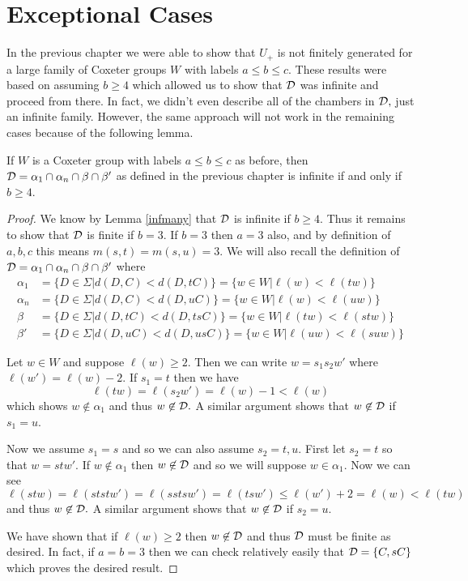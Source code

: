 \documentclass[class=book, crop=false]{standalone}
\begin{document}
\chapter{Exceptional Cases}
In the previous chapter we were able to show that $U_+$ is not finitely generated for a large family of Coxeter groups $W$ with labels $a\le b\le c.$ These results were based on assuming $b\ge 4$ which allowed us to show that $\mathcal{D}$ was infinite and proceed from there. In fact, we didn't even describe all of the chambers in $\mathcal{D},$ just an infinite family. However, the same approach will not work in the remaining cases because of the following lemma.
\begin{lemma} If $W$ is a Coxeter group with labels $a\le b\le c$ as before, then $\mathcal{D}=\alpha_1\cap \alpha_n\cap \beta\cap \beta'$ as defined in the previous chapter is infinite if and only if $b\ge 4.$
	\label{infD}
\end{lemma}
\begin{proof}
	We know by Lemma \ref{infmany} that $\mathcal{D}$ is infinite if $b\ge 4.$ Thus it remains to show that $\mathcal{D}$ is finite if $b=3.$ If $b=3$ then $a=3$ also, and by definition of $a,b,c$ this means $m(s,t)=m(s,u)=3.$ We will also recall the definition of $\mathcal{D}=\alpha_1\cap \alpha_n\cap \beta \cap \beta'$ where
	\begin{align*}
	\alpha_1&=\{D\in \Sigma|d(D,C)<d(D,tC)\}=\{w\in W|\ell(w)<\ell(tw)\}\\
	\alpha_n&=\{D\in \Sigma|d(D,C)<d(D,uC)\}=\{w\in W|\ell(w)<\ell(uw)\}\\
	\beta&=\{D\in \Sigma|d(D,tC)<d(D,tsC)\}=\{w\in W|\ell(tw)<\ell(stw)\}\\
	\beta'&=\{D\in \Sigma|d(D,uC)<d(D,usC)\}=\{w\in W|\ell(uw)<\ell(suw)\}
\end{align*}

Let $w\in W$ and suppose $\ell(w)\ge 2.$ Then we can write $w=s_1s_2w'$ where $\ell(w')=\ell(w)-2.$ If $s_1=t$ then we have
\[
	\ell(tw)=\ell(s_2w')=\ell(w)-1<\ell(w)
\]
which shows $w\not\in \alpha_1$ and thus $w\not\in \mathcal{D}.$ A similar argument shows that $w\not\in \mathcal{D}$ if $s_1=u.$

Now we assume $s_1=s$ and so we can also assume $s_2=t,u.$ First let $s_2=t$ so that $w=stw'.$ If $w\not\in \alpha_1$ then $w\not\in \mathcal{D}$ and so we will suppose $w\in\alpha_1.$ Now we can see
\[
	\ell(stw)=\ell(ststw')=\ell(sstsw')=\ell(tsw')\le \ell(w')+2=\ell(w)<\ell(tw)
\]
and thus $w\not\in \mathcal{D}.$ A similar argument shows that $w\not\in \mathcal{D}$ if $s_2=u.$

We have shown that if $\ell(w)\ge 2$ then $w\not\in \mathcal{D}$ and thus $\mathcal{D}$ must be finite as desired. In fact, if $a=b=3$ then we can check relatively easily that $\mathcal{D}=\{C,sC\}$ which proves the desired result.
\end{proof}
\end{document}
